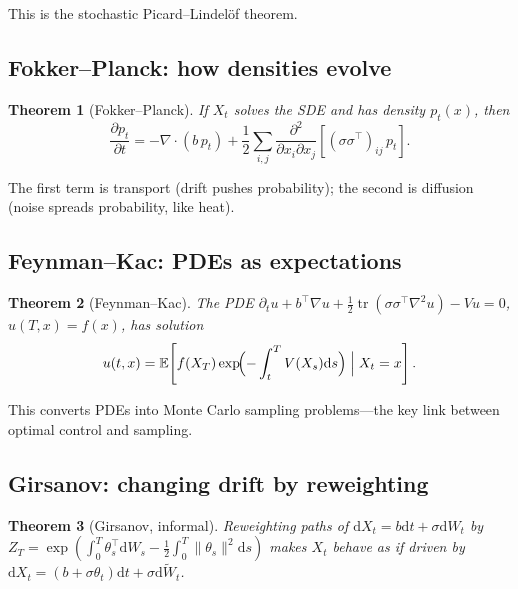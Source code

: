 \documentclass[11pt,letterpaper]{article}
\theoremstyle{plain}
\newtheorem{theorem}{Theorem}[section]
\theoremstyle{definition}
\theoremstyle{remark}
\newcommand{\E}{\mathbb{E}}
\newcommand{\dd}{\mathrm{d}}
\newcommand{\tr}{\operatorname{tr}}
\newcommand{\grad}{\nabla}
\newcommand{\divg}{\nabla\cdot}
\newcommand{\norm}[1]{\lVert #1\rVert}
\begin{document}
\begin{advancedmath}
This is the stochastic Picard--Lindel\"of theorem.

\subsection{Fokker--Planck: how densities evolve}

\begin{theorem}[Fokker--Planck]\label{thm:fp}
If $X_t$ solves the SDE and has density $p_t(x)$, then
\begin{equation}
  \frac{\partial p_t}{\partial t}
  = -\divg(b\,p_t) + \frac{1}{2}\sum_{i,j}\frac{\partial^2}{\partial x_i\partial x_j}
    [(\sigma\sigma^\top)_{ij}\,p_t].
  \label{eq:fp}
\end{equation}
\end{theorem}

The first term is transport (drift pushes probability); the second is
diffusion (noise spreads probability, like heat).

\subsection{Feynman--Kac: PDEs as expectations}

\begin{theorem}[Feynman--Kac]\label{thm:fk}
The PDE $\partial_t u+b^\top\grad u+\frac{1}{2}\tr(\sigma\sigma^\top\nabla^2u)-Vu=0$,
$u(T,x)=f(x)$, has solution
\begin{equation}
  u(t,x) = \E\!\left[f(X_T)\exp\!\Bigl(-\int_t^T V(X_s)\dd s\Bigr)\;\Big|\;X_t=x\right].
  \label{eq:fk}
\end{equation}
\end{theorem}

This converts PDEs into Monte Carlo sampling problems---the key link
between optimal control and sampling.

\subsection{Girsanov: changing drift by reweighting}

\begin{theorem}[Girsanov, informal]\label{thm:girsanov}
Reweighting paths of $\dd X_t=b\dd t+\sigma\dd W_t$ by
$Z_T=\exp(\int_0^T\theta_s^\top\dd W_s-\frac{1}{2}\int_0^T\norm{\theta_s}^2\dd s)$
makes $X_t$ behave as if driven by $\dd X_t=(b+\sigma\theta_t)\dd t+\sigma\dd\tilde W_t$.
\end{theorem}


\end{advancedmath}
\end{document}
